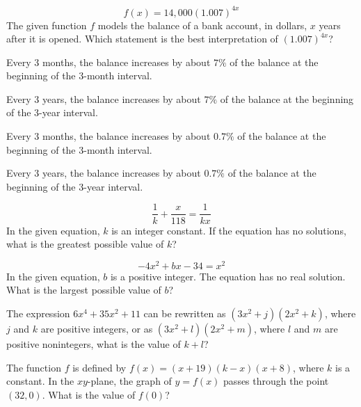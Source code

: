\vfill
\clearpage
\noindent\begin{minipage}{\linewidth}
\par\smallskip
$$f(x)=14{,}000(1.007)^{4x}$$ The given function $f$ models the balance of a bank account, in dollars, $x$ years after it is opened. Which statement is the best interpretation of $(1.007)^{4x}$?
\begin{satchoices}
  \item[A)] Every 3 months, the balance increases by about $7\%$ of the balance at the beginning of the 3-month interval.
  \item[B)] Every 3 years, the balance increases by about $7\%$ of the balance at the beginning of the 3-year interval.
  \item[C)] Every 3 months, the balance increases by about $0.7\%$ of the balance at the beginning of the 3-month interval.
  \item[D)] Every 3 years, the balance increases by about $0.7\%$ of the balance at the beginning of the 3-year interval.
\end{satchoices}
\end{minipage}
\vfill
\noindent\begin{minipage}{\linewidth}
\par\smallskip
$$\frac{1}{k}+\frac{x}{118}=\frac{1}{kx}$$ In the given equation, $k$ is an integer constant. If the equation has no solutions, what is the greatest possible value of $k$?
\end{minipage}
\vfill
\noindent\begin{minipage}{\linewidth}
\par\smallskip
$$-4x^2+bx-34=x^2$$ In the given equation, $b$ is a positive integer. The equation has no real solution. What is the largest possible value of $b$?
\end{minipage}
\vfill
\clearpage
\noindent\begin{minipage}{\linewidth}
\par\smallskip
The expression $6x^4+35x^2+11$ can be rewritten as $(3x^2+j)(2x^2+k)$, where $j$ and $k$ are positive integers, or as $(3x^2+l)(2x^2+m)$, where $l$ and $m$ are positive nonintegers, what is the value of $k+l$?
\end{minipage}
\vfill
\noindent\begin{minipage}{\linewidth}
\par\smallskip
The function $f$ is defined by $f(x)=(x+19)(k-x)(x+8)$, where $k$ is a constant. In the $xy$-plane, the graph of $y=f(x)$ passes through the point $(32,0)$. What is the value of $f(0)$?
\end{minipage}
